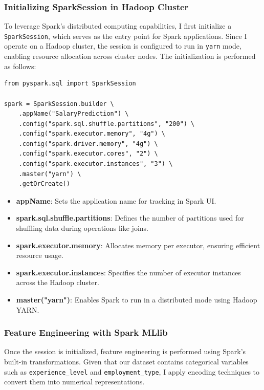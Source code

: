 \documentclass[12pt,a4paper]{article}
\begin{document}
\begin{multicols}{2}
\subsubsection{Initializing SparkSession in Hadoop Cluster}

To leverage Spark's distributed computing capabilities, I first initialize a \texttt{SparkSession}, which serves as the entry point for Spark applications. Since I operate on a Hadoop cluster, the session is configured to run in \texttt{yarn} mode, enabling resource allocation across cluster nodes. The initialization is performed as follows:

\begin{lstlisting}
from pyspark.sql import SparkSession

spark = SparkSession.builder \
    .appName("SalaryPrediction") \
    .config("spark.sql.shuffle.partitions", "200") \
    .config("spark.executor.memory", "4g") \
    .config("spark.driver.memory", "4g") \
    .config("spark.executor.cores", "2") \
    .config("spark.executor.instances", "3") \
    .master("yarn") \
    .getOrCreate()
\end{lstlisting}

\begin{itemize}
    \item \textbf{appName}: Sets the application name for tracking in Spark UI.
    \item \textbf{spark.sql.shuffle.partitions}: Defines the number of partitions used for shuffling data during operations like joins.
    \item \textbf{spark.executor.memory}: Allocates memory per executor, ensuring efficient resource usage.
    \item \textbf{spark.executor.instances}: Specifies the number of executor instances across the Hadoop cluster.
    \item \textbf{master("yarn")}: Enables Spark to run in a distributed mode using Hadoop YARN.
\end{itemize}

\subsubsection{Feature Engineering with Spark MLlib}
Once the session is initialized, feature engineering is performed using Spark's built-in transformations. Given that our dataset contains categorical variables such as \texttt{experience\_level} and \texttt{employment\_type}, I apply encoding techniques to convert them into numerical representations.


\end{multicols}
\end{document}
